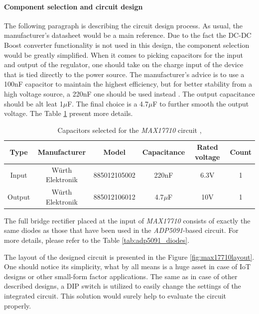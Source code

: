\documentclass[12pt,a4paper]{article}
\begin{document}
\paragraph{Component selection and circuit design}
The following paragraph is describing the circuit design process. As usual, the manufacturer's datasheet \cite{max17710_params} would be a main reference. Due to the fact the DC-DC Boost converter functionality is not used in this design, the component selection would be greatly simplified. When it comes to picking capacitors for the input and output of the regulator, one should take on the charge input of the device that is tied directly to the power source. The manufacturer's advice is to use a 100nF capacitor to maintain the highest efficiency, but for better stability from a high voltage source, a 220nF one should be used instead \cite{max17710_params}. The output capacitance should be alt leat 1$\mu$F. The final choice is a 4.7$\mu$F to further smooth the output voltage. The Table \ref{tab:max17710_capacitors} present more details. 
\begin{table}[ht!]
\begin{tabular}{|c|c|c|c|c|c|}
\hline
 \textbf{Type} & \textbf{Manufacturer} & \textbf{Model} & \textbf{Capacitance} & \textbf{Rated voltage} & \textbf{Count}	\\ \hline
Input & Würth Elektronik & 885012105002  & 220nF & 6.3V & 1      \\ \hline
Output & Würth Elektronik & 885012106012  & 4.7$\mu$F & 10V & 1      \\ \hline
\end{tabular}
\caption{Capacitors selected for the \textit{MAX17710} circuit \cite{max17710_inputcapacitor}, \cite{max17710_outputcapacitor}}
\label{tab:max17710_capacitors}
\end{table}
\par
The full bridge rectifier placed at the input of \textit{MAX17710} consists of exactly the same diodes as those that have been used in the \textit{ADP5091}-based circuit. For more details, please refer to the Table \ref{tab:adp5091_diodes}.
\par

The layout of the designed circuit is presented in the Figure \ref{fig:max17710layout}. One should notice its simplicity, what by all means is a huge asset in case of IoT designs or other small-form factor applications. The same as in case of other described designs, a DIP switch is utilized to easily change the settings of the integrated circuit. This solution would surely help to evaluate the circuit properly.
\end{document}
